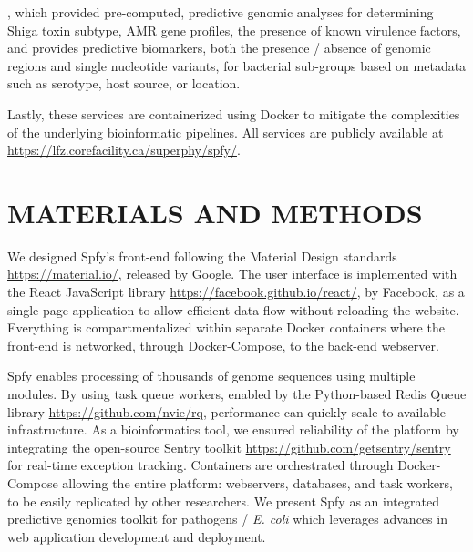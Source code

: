 \documentclass[a4,center,fleqn]{NAR}
\begin{document}
, which provided pre-computed, predictive genomic analyses for determining Shiga toxin subtype, AMR gene profiles, the presence of known virulence factors, and provides predictive biomarkers, both the presence / absence of genomic regions and single nucleotide variants, for bacterial sub-groups based on metadata such as serotype, host source, or location.




Lastly, these services are containerized using Docker to mitigate the complexities of the underlying bioinformatic pipelines.
All services are publicly available at \url{https://lfz.corefacility.ca/superphy/spfy/}.

\enlargethispage{-65.1pt}

\section{MATERIALS AND METHODS}

We designed Spfy's front-end following the Material Design standards \url{https://material.io/}, released by Google.
The user interface is implemented with the React JavaScript library \url{https://facebook.github.io/react/}, by Facebook, as a single-page application to allow efficient data-flow without reloading the website.
Everything is compartmentalized within separate Docker containers where the front-end is networked, through Docker-Compose, to the back-end webserver.

Spfy enables processing of thousands of genome sequences using multiple modules.
By using task queue workers, enabled by the Python-based Redis Queue library \url{https://github.com/nvie/rq}, performance can quickly scale to available infrastructure.
As a bioinformatics tool, we ensured reliability of the platform by integrating the open-source Sentry toolkit \url{https://github.com/getsentry/sentry} for real-time exception tracking.
Containers are orchestrated through Docker-Compose allowing the entire platform: webservers, databases, and task workers, to be easily replicated by other researchers.
We present Spfy as an integrated predictive genomics toolkit for pathogens / \textit{E. coli} which leverages advances in web application development and deployment.
\end{document}
